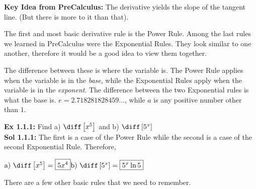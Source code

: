 \textbf{Key Idea from PreCalculus:} The derivative yields the slope of the tangent line. (But there is more to it than that). \par
The first and most basic derivative rule is the Power Rule. Among the last rules we learned in PreCalculus were the Exponential Rules. They look similar to one another, therefore it would be a good idea to view them together. 


The difference between these is where the variable is. The Power Rule applies when the variable is in the \textit{base}, while the Exponential Rules apply when the variable is in the \textit{exponent}. The difference between the two Exponential rules is what the base is. $e = 2.718281828459 \dots$, while $a$ is any positive number other than $1$. \par 


\textbf{Ex 1.1.1:} Find a) $\diff\left[x^5\right]$ and b) $\diff\left[5^x\right]$ \\[11pt]
\textbf{Sol 1.1.1:} The first is a case of the Power Rule while the second is a case of the second Exponential Rule. Therefore, 
\begin{center}
$\hfill \text{a) } \diff\left[x^5\right] = \boxed{5x^4} \hfill \text{b) } \diff\left[5^x\right] = \boxed{5^x \ln{5}} \hfill$
\end{center}  

There are a few other basic rules that we need to remember. 


